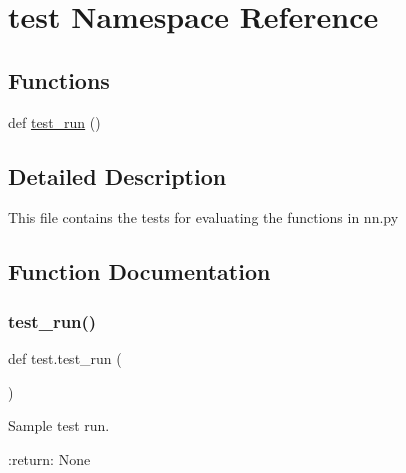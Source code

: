 \hypertarget{namespacetest}{}\section{test Namespace Reference}
\label{namespacetest}
\subsection*{Functions}
\begin{DoxyCompactItemize}
\item 
def \mbox{\hyperlink{namespacetest_ae33228479f5f6d2957b7e3b5177e1328}{test\+\_\+run}} ()
\end{DoxyCompactItemize}


\subsection{Detailed Description}
\begin{DoxyVerb}This file contains the tests for evaluating the functions in nn.py
\end{DoxyVerb}
 

\subsection{Function Documentation}
\mbox{\label{namespacetest_ae33228479f5f6d2957b7e3b5177e1328}} 
\subsubsection{\texorpdfstring{test\+\_\+run()}{test\_run()}}
{\footnotesize\ttfamily def test.\+test\+\_\+run (\begin{DoxyParamCaption}{ }\end{DoxyParamCaption})}

\begin{DoxyVerb}Sample test run.

:return: None
\end{DoxyVerb}
 